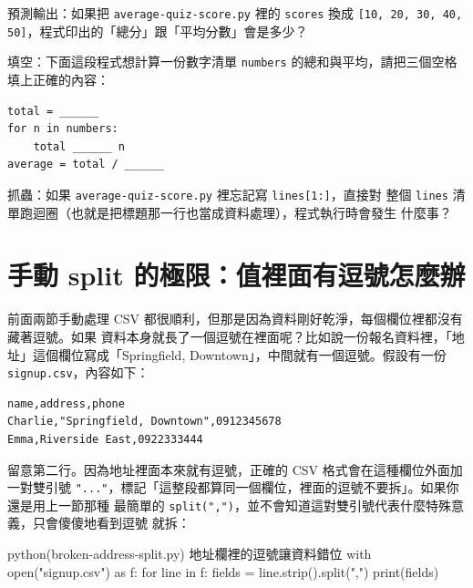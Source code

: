 
\begin{drills}[label=drills:csv-manual-average]
\item 預測輸出：如果把 \texttt{average-quiz-score.py} 裡的 \texttt{scores} 換成
\texttt{[10, 20, 30, 40, 50]}，程式印出的「總分」跟「平均分數」會是多少？
\item 填空：下面這段程式想計算一份數字清單 \texttt{numbers} 的總和與平均，請把三個空格
填上正確的內容：
\begin{verbatim}
total = ______
for n in numbers:
    total ______ n
average = total / ______
\end{verbatim}
\item 抓蟲：如果 \texttt{average-quiz-score.py} 裡忘記寫 \texttt{lines[1:]}，直接對
整個 \texttt{lines} 清單跑迴圈（也就是把標題那一行也當成資料處理），程式執行時會發生
什麼事？
\end{drills}

\section{手動 split 的極限：值裡面有逗號怎麼辦}
\label{sec:csv-manual-limits}

前面兩節手動處理 CSV 都很順利，但那是因為資料剛好乾淨，每個欄位裡都沒有藏著逗號。如果
資料本身就長了一個逗號在裡面呢？比如說一份報名資料裡，「地址」這個欄位寫成「Springfield,
Downtown」，中間就有一個逗號。假設有一份 \texttt{signup.csv}，內容如下：

\begin{verbatim}
name,address,phone
Charlie,"Springfield, Downtown",0912345678
Emma,Riverside East,0922333444
\end{verbatim}

留意第二行。因為地址裡面本來就有逗號，正確的 CSV 格式會在這種欄位外面加一對雙引號
\texttt{"..."}，標記「這整段都算同一個欄位，裡面的逗號不要拆」。如果你還是用上一節那種
最簡單的 \texttt{split(",")}，並不會知道這對雙引號代表什麼特殊意義，只會傻傻地看到逗號
就拆：

\begin{example}{python}{(broken-address-split.py) 地址欄裡的逗號讓資料錯位}
with open("signup.csv") as f:
    for line in f:
        fields = line.strip().split(",")
        print(fields)
\end{example}

